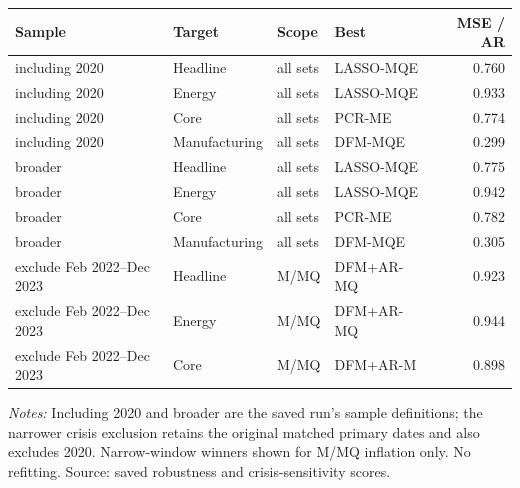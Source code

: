 \begin{threeparttable}
\begin{tabular}{llllr}
\toprule
Sample & Target & Scope & Best & MSE / AR \\
\midrule
including 2020 & Headline & all sets & LASSO-MQE & 0.760 \\
including 2020 & Energy & all sets & LASSO-MQE & 0.933 \\
including 2020 & Core & all sets & PCR-ME & 0.774 \\
including 2020 & Manufacturing & all sets & DFM-MQE & 0.299 \\
broader & Headline & all sets & LASSO-MQE & 0.775 \\
broader & Energy & all sets & LASSO-MQE & 0.942 \\
broader & Core & all sets & PCR-ME & 0.782 \\
broader & Manufacturing & all sets & DFM-MQE & 0.305 \\
exclude Feb 2022--Dec 2023 & Headline & M/MQ & DFM+AR-MQ & 0.923 \\
exclude Feb 2022--Dec 2023 & Energy & M/MQ & DFM+AR-MQ & 0.944 \\
exclude Feb 2022--Dec 2023 & Core & M/MQ & DFM+AR-M & 0.898 \\
\bottomrule
\end{tabular}
\begin{tablenotes}[flushleft]\footnotesize
\item \textit{Notes:} Including 2020 and broader are the saved run's sample definitions; the narrower crisis exclusion retains the original matched primary dates and also excludes 2020. Narrow-window winners shown for M/MQ inflation only. No refitting. Source: saved robustness and crisis-sensitivity scores.
\end{tablenotes}
\end{threeparttable}
